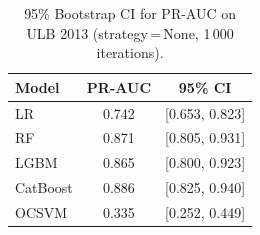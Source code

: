 \begin{table}[ht]
\centering
\caption{95\% Bootstrap CI for PR-AUC on ULB 2013 (strategy\,=\,None, 1\,000 iterations).}
\label{tab:ci_ulb}
\begin{tabular}{l c c}
\toprule
Model & PR-AUC & 95\% CI \\
\midrule
LR         & 0.742 & [0.653, 0.823] \\
RF         & 0.871 & [0.805, 0.931] \\
LGBM       & 0.865 & [0.800, 0.923] \\
CatBoost   & 0.886 & [0.825, 0.940] \\
OCSVM      & 0.335 & [0.252, 0.449] \\
\bottomrule
\end{tabular}
\end{table}